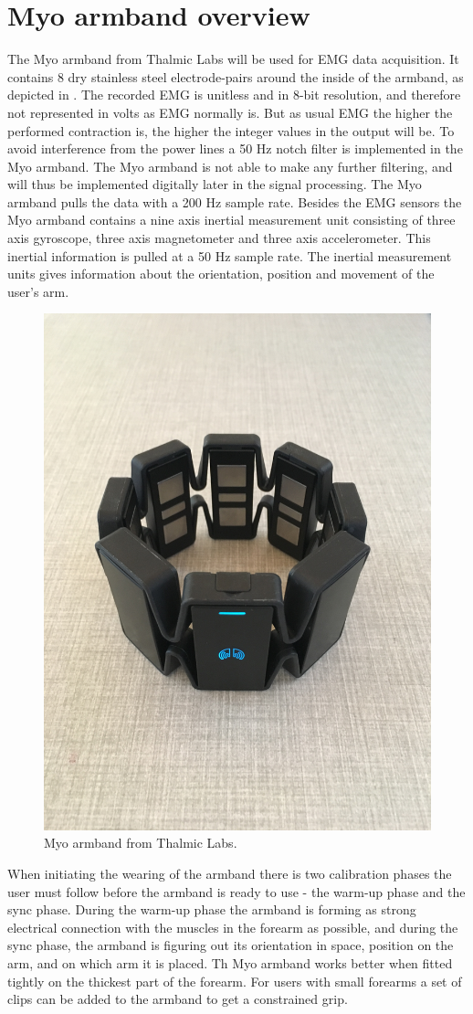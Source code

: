 \section{Myo armband overview}

The Myo armband from Thalmic Labs will be used for EMG data acquisition. It contains 8 dry stainless steel electrode-pairs around the inside of the armband, as depicted in . The recorded EMG is unitless and in 8-bit resolution, and therefore not represented in volts as EMG normally is. But as usual EMG the higher the performed contraction is, the higher the integer values in the output will be. To avoid interference from the power lines a 50 Hz notch filter is implemented in the Myo armband. The Myo armband is not able to make any further filtering, and will thus be implemented digitally later in the signal processing. The Myo armband pulls the data with a 200 Hz sample rate. Besides the EMG sensors the Myo armband contains a nine axis inertial measurement unit consisting of three axis gyroscope, three axis magnetometer and three axis accelerometer. This inertial information is pulled at a 50 Hz sample rate. The inertial measurement units gives information about the orientation, position and movement of the user’s arm. 

\begin{figure}[H]                 
	\includegraphics[width=.4\textwidth]{figures/xBackground/myoband}  
	\caption{Myo armband from Thalmic Labs.}
	\label{fig:myoarmband} 
\end{figure}

When initiating the wearing of the armband there is two calibration phases the user must follow before the armband is ready to use - the warm-up phase and the sync phase. During the warm-up phase the armband is forming as strong electrical connection with the muscles in the forearm as possible, and during the sync phase, the armband is figuring out its orientation in space, position on the arm, and on which arm it is placed. Th Myo armband works better when fitted tightly on the thickest part of the forearm. For users with small forearms a set of clips can be added to the armband to get a constrained grip. 

